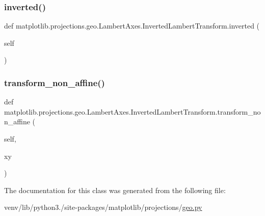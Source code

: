 \subsubsection{\texorpdfstring{inverted()}{inverted()}}
{\footnotesize\ttfamily def matplotlib.\+projections.\+geo.\+Lambert\+Axes.\+Inverted\+Lambert\+Transform.\+inverted (\begin{DoxyParamCaption}\item[{}]{self }\end{DoxyParamCaption})}

\mbox{\label{classmatplotlib_1_1projections_1_1geo_1_1LambertAxes_1_1InvertedLambertTransform_a39e25eb054a94af25b9bf4b77acecfae}} 
\subsubsection{\texorpdfstring{transform\+\_\+non\+\_\+affine()}{transform\_non\_affine()}}
{\footnotesize\ttfamily def matplotlib.\+projections.\+geo.\+Lambert\+Axes.\+Inverted\+Lambert\+Transform.\+transform\+\_\+non\+\_\+affine (\begin{DoxyParamCaption}\item[{}]{self,  }\item[{}]{xy }\end{DoxyParamCaption})}



The documentation for this class was generated from the following file\+:\begin{DoxyCompactItemize}
\item 
venv/lib/python3./site-\/packages/matplotlib/projections/\hyperlink{geo_8py}{geo.\+py}\end{DoxyCompactItemize}
